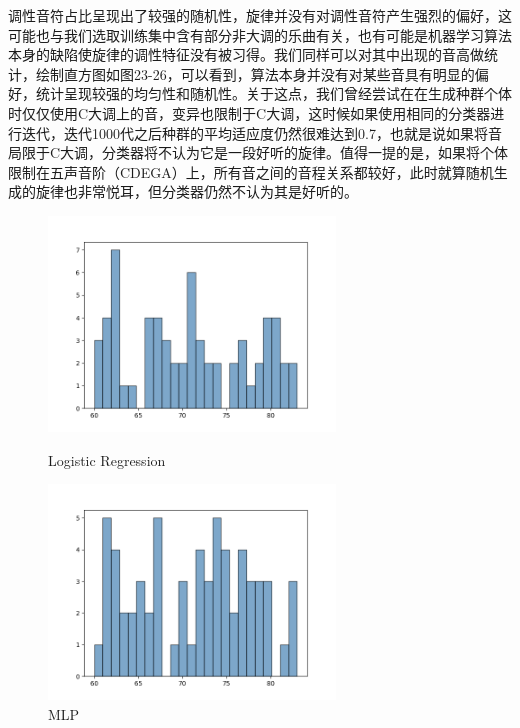 \documentclass[UTF8,a4paper,10pt]{ctexart}
\begin{document}
\begin{itemize}
    调性音符占比呈现出了较强的随机性，旋律并没有对调性音符产生强烈的偏好，这可能也与我们选取训练集中含有部分非大调的乐曲有关，也有可能是机器学习算法本身的缺陷使旋律的调性特征没有被习得。我们同样可以对其中出现的音高做统计，绘制直方图如图23-26，可以看到，算法本身并没有对某些音具有明显的偏好，统计呈现较强的均匀性和随机性。关于这点，我们曾经尝试在在生成种群个体时仅仅使用C大调上的音，变异也限制于C大调，这时候如果使用相同的分类器进行迭代，迭代1000代之后种群的平均适应度仍然很难达到0.7，也就是说如果将音局限于C大调，分类器将不认为它是一段好听的旋律。值得一提的是，如果将个体限制在五声音阶（CDEGA）上，所有音之间的音程关系都较好，此时就算随机生成的旋律也非常悦耳，但分类器仍然不认为其是好听的。

    \begin{figure}[H]
    \begin{minipage}[t]{0.5\linewidth}
    \centering
    \includegraphics[width=3in]{output_logreg_hist_1.png}
    \caption{Logistic Regression}
    \label{fig:side:a}
    \end{minipage}%
    \begin{minipage}[t]{0.5\linewidth}
    \centering
    \includegraphics[width=3in]{output_mlp_hist_1.png}
    \caption{MLP}
    \label{fig:side:b}
    \end{minipage}
    \end{figure}


\end{itemize}
\end{document}
